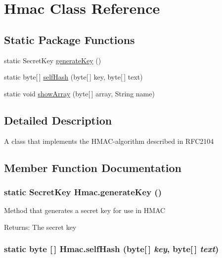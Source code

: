 \hypertarget{class_hmac}{
\section{Hmac Class Reference}
\label{class_hmac}
}
\subsection*{Static Package Functions}
\begin{CompactItemize}
\item 
static Secret\-Key \hyperlink{class_hmac_g0}{generate\-Key} ()
\item 
static byte\mbox{[}$\,$\mbox{]} \hyperlink{class_hmac_g1}{self\-Hash} (byte\mbox{[}$\,$\mbox{]} key, byte\mbox{[}$\,$\mbox{]} text)
\item 
static void \hyperlink{class_hmac_g2}{show\-Array} (byte\mbox{[}$\,$\mbox{]} array, String name)
\end{CompactItemize}


\subsection{Detailed Description}
A class that implements the HMAC-algorithm described in RFC2104 



\subsection{Member Function Documentation}
\hypertarget{class_hmac_g0}{
\subsubsection[generateKey]{\setlength{\rightskip}{0pt plus 5cm}static Secret\-Key Hmac.generate\-Key ()}}
\label{class_hmac_g0}


Method that generates a secret key for use in HMAC \begin{Desc}
\item[Returns:]The secret key \end{Desc}
\hypertarget{class_hmac_g1}{
\subsubsection[selfHash]{\setlength{\rightskip}{0pt plus 5cm}static byte \mbox{[}$\,$\mbox{]} Hmac.self\-Hash (byte\mbox{[}$\,$\mbox{]} {\em key}, byte\mbox{[}$\,$\mbox{]} {\em text})}}
\label{class_hmac_g1}


